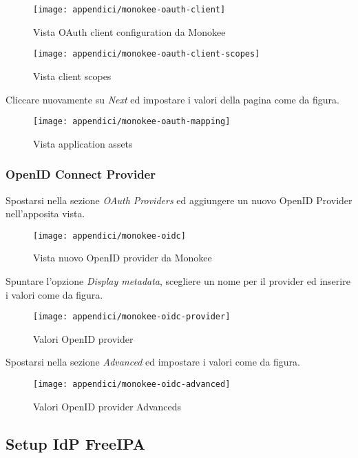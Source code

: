 \begin{figure}[!h] 
  \centering 
  \texttt{[image: appendici/monokee-oauth-client]} 
  \caption{Vista OAuth client configuration da Monokee}
\end{figure}

\begin{figure}[!h] 
  \centering 
  \texttt{[image: appendici/monokee-oauth-client-scopes]} 
  \caption{Vista client scopes}
\end{figure}


Cliccare nuovamente su \emph{Next} ed impostare i valori della pagina
come da figura.

\begin{figure}[!h] 
  \centering 
  \texttt{[image: appendici/monokee-oauth-mapping]} 
  \caption{Vista application assets}
\end{figure}


\hypertarget{openid-connect-provider}{%
\subsubsection{OpenID Connect Provider}\label{openid-connect-provider}}

Spostarsi nella sezione \emph{OAuth Providers} ed aggiungere un nuovo
OpenID Provider nell'apposita vista.

\begin{figure}[!h] 
  \centering 
  \texttt{[image: appendici/monokee-oidc]} 
  \caption{Vista nuovo OpenID provider da Monokee}
\end{figure}


Spuntare l'opzione \emph{Display metadata}, scegliere un nome per il
provider ed inserire i valori come da figura.

\begin{figure}[!h] 
  \centering 
  \texttt{[image: appendici/monokee-oidc-provider]} 
  \caption{Valori OpenID provider}
\end{figure}


Spostarsi nella sezione \emph{Advanced} ed impostare i valori come da
figura.

\begin{figure}[!h] 
  \centering 
  \texttt{[image: appendici/monokee-oidc-advanced]} 
  \caption{Valori OpenID provider Advanceds}
\end{figure}


\hypertarget{setup-idp-freeipa}{%
\subsection{Setup IdP FreeIPA}\label{setup-idp-freeipa}}

